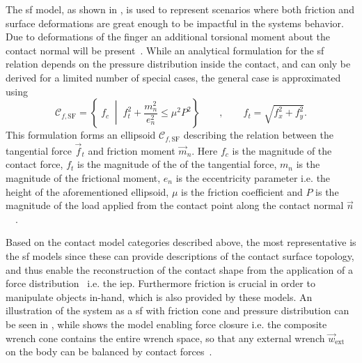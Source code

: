 The \gls{sf} model, as shown in , is used to represent scenarios where both friction and surface deformations are great enough to be impactful in the systems behavior. Due to deformations of the finger an additional torsional moment about the contact normal will be present~\cite[Chapter 38]{handbook-of-robotics}. While an analytical formulation for the \gls{sf} relation depends on the pressure distribution inside the contact, and
can only be derived for a limited number of special cases, the general case is approximated using 
%
\begin{equation} 
	\mathcal{C}_{f,\text{SF}} = \left\{ \; f_c \; \middle| \; f_t^2 + \frac{m_n^2}{e_n^2} \le \mu^2 P^2 \right\} \qquad , \qquad f_t = \sqrt{f_x^2 + f_y^2}.
	\label{eq:sf}
\end{equation}
This formulation forms an ellipsoid $\mathcal{C}_{f,\text{SF}}$ describing the relation between the tangential force $\vec{f}_t$ and friction moment $\vec{m}_n$. Here $f_c$ is the magnitude of the contact force, $f_t$ is the magnitude of the of the tangential force, $m_n$ is the magnitude of the frictional moment, $e_n$ is the eccentricity parameter i.e. the height of the aforementioned ellipsoid, $\mu$ is the friction coefficient and $P$ is the magnitude of the load applied from the contact point along the contact normal $\vec{n}$~\cite{practical-force-motion-models-for-sliding-manipulation}~\cite{soft-finger-model-with-adaptive-contact-geometry-for-grasping-and-manipulation-tasks}. \medskip

Based on the contact model categories described above, the most representative is the \gls{sf} models since these can provide descriptions of the contact surface topology, and thus enable the reconstruction of the contact shape from the application of a force distribution~\cite{contact-mechanics} i.e. the \gls{iep}. Furthermore friction is crucial in order to manipulate objects in-hand, which is also provided by these models. An illustration of the system as a \gls{sf} with friction cone and pressure distribution can be seen in , while  shows the model enabling force closure i.e. the composite wrench cone contains the entire wrench space, so that any external wrench $\vec{w}_{\text{ext}}$ on the body can be balanced by contact forces~\cite{modern-robotics-mechanics-planning-and-control}.

